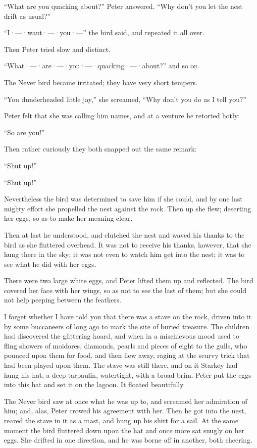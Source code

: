 “What are you quacking about?\@” Peter answered.
“Why don’t you let the nest drift as usual?”

“I·—·want·—·you·—” the bird said, and repeated it all over.

Then Peter tried slow and distinct.

“What·—·are·—·you·—·quacking·—·about?\@” and so on.

The Never bird became irritated;
they have very short tempers.

“You dunderheaded little jay,” she screamed,
“Why don’t you do as I tell you?”

Peter felt that she was calling him names, and at a venture he retorted hotly:

“So are you!”

Then rather curiously they both snapped out the same remark:

“Shut up!”

“Shut up!”

Nevertheless the bird was determined to save him if she could,
and by one last mighty effort she propelled the nest against the rock.
Then up she flew;
deserting her eggs, so as to make her meaning clear.

Then at last he understood, and clutched the nest and waved his thanks to the bird as she fluttered overhead.
It was not to receive his thanks, however, that she hung there in the sky;
it was not even to watch him get into the nest;
it was to see what he did with her eggs.

There were two large white eggs, and Peter lifted them up and reflected.
The bird covered her face with her wings, so as not to see the last of them;
but she could not help peeping between the feathers.

I forget whether I have told you that there was a stave on the rock,
driven into it by some buccaneers of long ago to mark the site of buried treasure.
The children had discovered the glittering hoard,
and when in a mischievous mood used to fling showers of moidores, diamonds, pearls and pieces of eight to the gulls,
who pounced upon them for food, and then flew away, raging at the scurvy trick that had been played upon them.
The stave was still there,
and on it Starkey had hung his hat, a deep tarpaulin, watertight, with a broad brim.
Peter put the eggs into this hat and set it on the lagoon.
It floated beautifully.

The Never bird saw at once what he was up to, and screamed her admiration of him;
and, alas, Peter crowed his agreement with her.
Then he got into the nest, reared the stave in it as a mast, and hung up his shirt for a sail.
At the same moment the bird fluttered down upon the hat and once more sat snugly on her eggs.
She drifted in one direction, and he was borne off in another, both cheering.

